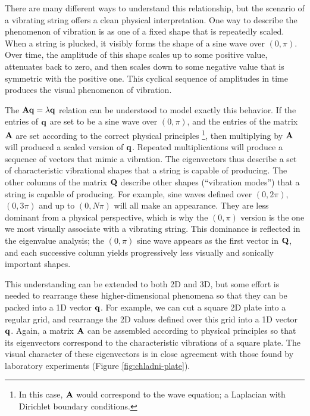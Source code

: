 \documentclass[11pt]{article}
\begin{document}
There are many different ways to understand this relationship, but the scenario of a vibrating string offers a clean physical interpretation. One way to describe the phenomenon of vibration is as one of a fixed shape that is repeatedly scaled. When a string is plucked, it visibly forms the shape of a sine wave over $(0, \pi)$. Over time, the amplitude of this shape scales up to some positive value, attenuates back to zero, and then scales down to some negative value that is symmetric with the positive one. This cyclical sequence of amplitudes in time produces the visual phenomenon of vibration.

The $\mathbf{A} \mathbf{q} = \lambda \mathbf{q}$ relation can be understood to model exactly this behavior. If the entries of $\mathbf{q}$ are set to be a sine wave over $(0, \pi)$, and the entries of the matrix $\mathbf{A}$ are set according to the correct physical principles \footnote{In this case, $\mathbf{A}$ would correspond to the wave equation; a Laplacian with Dirichlet boundary conditions.}, then multiplying by $\mathbf{A}$ will produced a scaled version of $\mathbf{q}$. Repeated multiplications will produce a sequence of vectors that mimic a vibration. The eigenvectors thus describe a set of characteristic vibrational shapes that a string is capable of producing. The other columns of the matrix $\mathbf{Q}$ describe other shapes (``vibration modes'') that a string is capable of producing. For example, sine waves defined over $(0, 2\pi)$, $(0, 3\pi)$ and up to $(0, N \pi)$ will all make an appearance. They are less dominant from a physical perspective, which is why the $(0, \pi)$ version is the one we most visually associate with a vibrating string. This dominance is reflected in the eigenvalue analysis; the $(0, \pi)$ sine wave appears as the first vector in $\mathbf{Q}$, and each successive column yields progressively less visually and sonically important shapes.

This understanding can be extended to both 2D and 3D, but some effort is needed to rearrange these higher-dimensional phenomena so that they can be packed into a 1D vector $\mathbf{q}$. For example, we can cut a square 2D plate into a regular grid, and rearrange the 2D values defined over this grid into a 1D vector $\mathbf{q}$. Again, a matrix $\mathbf{A}$ can be assembled according to physical principles so that its eigenvectors correspond to the characteristic vibrations of a square plate. The visual character of these eigenvectors is in close agreement with those found by laboratory experiments (Figure \ref{fig:chladni-plate}).

\end{document}
